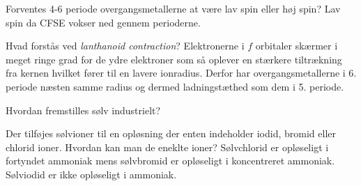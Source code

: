 
\begin{flashcard}[Teori]{Forventes 4-6 periode overgangsmetallerne at være lav spin eller høj spin?}
Lav spin da CFSE vokser ned gennem perioderne.
\end{flashcard}

\begin{flashcard}[Teori]{Hvad forstås ved \textit{lanthanoid contraction}?}
Elektronerne i $f$ orbitaler skærmer i meget ringe grad for de ydre elektroner som så oplever en stærkere tiltrækning fra kernen hvilket fører til en lavere ionradius. Derfor har overgangsmetallerne i 6. periode næsten samme radius og dermed ladningstæthed som dem i 5. periode.
\end{flashcard}

\begin{flashcard}[Fremstilling]{Hvordan fremstilles sølv industrielt?}
\\\vspace*{0.5cm}
\end{flashcard}

\begin{flashcard}[Reaktion]{Der tilføjes sølvioner til en opløsning der enten indeholder iodid, bromid eller chlorid ioner. Hvordan kan man de eneklte ioner?}
Sølvchlorid er opløseligt i fortyndet ammoniak mens sølvbromid er opløseligt i koncentreret ammoniak. Sølviodid er ikke opløseligt i ammoniak.\\\vspace*{0.5cm}
\\
\end{flashcard}